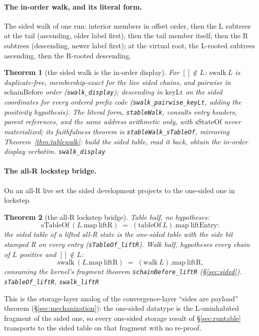 \documentclass[11pt]{article}
\newtheorem{theorem}{Theorem}[section]
\newcommand{\lean}[1]{\texttt{#1}}
\begin{document}
\paragraph{The in-order walk, and its literal form.} The sided walk of
one run: interior members in offset order, then the L subtrees at the
tail (ascending, older label first), then the tail member itself, then
the R subtrees (descending, newer label first); at the virtual root,
the L-rooted subtrees ascending, then the R-rooted descending.
\begin{theorem}[the sided walk is the in-order display]
\label{thm:sidedwalk}
For $[] \notin L$: $\mathrm{swalk}\ L$ is duplicate-free,
membership-exact for the live sided chains, and pairwise in
$\mathrm{schainBefore}$ order (\lean{swalk\_display}); descending in
$\mathrm{keyLt}$ on the sided coordinates for every ordered prefix
code (\lean{swalk\_pairwise\_keyLt}, adding the positivity
hypothesis). The literal form, \lean{stableWalk}, consults entry
headers, parent references, and the same address arithmetic only, with
$\mathrm{sStateOf}$ never materialized; its faithfulness theorem is
\lean{stableWalk\_sTableOf}, mirroring Theorem~\ref{thm:tablewalk}:
build the sided table, read it back, obtain the in-order display
verbatim.
\hfill\lean{swalk\_display}
\end{theorem}

\paragraph{The all-R lockstep bridge.} On an all-R live set the sided
development projects to the one-sided one in lockstep.

\begin{theorem}[the all-R lockstep bridge]
\label{thm:liftR}
Table half, no hypotheses:
\[
  \mathrm{sTableOf}\ (L.\mathrm{map}\ \mathrm{liftR}) \;=\;
  (\mathrm{tableOf}\ L).\mathrm{map}\ \mathrm{liftEntry} :
\]
the sided table of a lifted all-R state \emph{is} the one-sided table
with the side bit stamped R on every entry (\lean{sTableOf\_liftR}).
Walk half, hypotheses every chain of $L$ positive and $[] \notin L$:
\[
  \mathrm{swalk}\ (L.\mathrm{map}\ \mathrm{liftR}) \;=\;
  (\mathrm{walk}\ L).\mathrm{map}\ \mathrm{liftR},
\]
consuming the kernel's fragment theorem \lean{schainBefore\_liftR}
(\S\ref{sec:sided}).
\hfill\lean{sTableOf\_liftR}, \lean{swalk\_liftR}
\end{theorem}

\noindent This is the storage-layer analog of the
convergence-layer ``sides are payload'' theorem
(\S\ref{sec:mechanization}): the one-sided datatype is the
L-uninhabited fragment of the sided one, so every one-sided storage
result of \S\ref{sec:runtable} transports to the sided table on that
fragment with no re-proof.
\end{document}
